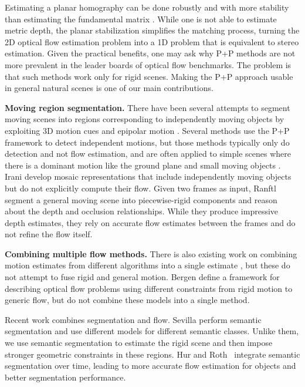 \documentclass[10pt,twocolumn,letterpaper]{article}
\begin{document}
Estimating a planar homography can be done robustly and with more stability
than estimating the fundamental matrix
\cite{Irani:1998:ReferenceFrames,Irani:PAMI:1997}. 
While one is not able to estimate metric depth, the planar
stabilization simplifies the matching process, turning the 2D optical
flow estimation problem into a 1D problem that is equivalent to stereo
estimation.
Given the practical benefits, one may ask why P+P
methods are not more prevalent in the leader boards of
optical flow benchmarks. 
The problem is that such methods work only for rigid scenes.
Making the P+P approach usable in general natural scenes is one of our main contributions.

{\bf Moving region segmentation.}
There have been several attempts to segment moving scenes into regions
corresponding to independently moving objects by exploiting 3D motion
cues and epipolar motion \cite{Adiv:1985:PAMI,Thompson:1990:IJCV,Weber:PAMI:1997}.
Several methods use the P+P framework to detect independent motions, but those
methods typically only do detection and not flow estimation, and are
often applied to simple scenes where there is a dominant motion
like the ground plane and small moving objects
\cite{Irani:1998:MovingObjectDetection,Sawhney:2000:PAMI,Yuan:2007:PAMI}.
Irani \etal \cite{Irani96efficientrepresentations} develop mosaic representations that
include independently moving objects but do not explicitly compute their
flow. Given two frames as input, Ranftl \etal~\cite{Ranftl:2016:DenseMonocularDepthEstimation} segment a general moving scene into piecewise-rigid components and reason about the depth and occlusion relationships.
While they produce impressive depth estimates,
they rely on accurate flow estimates between the frames and do not refine the flow itself.










{\bf Combining multiple flow methods.}
There is also existing work on combining motion
estimates from different algorithms into a single estimate \cite{FusionFlow,Brostow},
but these do not attempt to fuse rigid and general motion.
Bergen \etal \cite{Bergen:ECCV:1992} define a
framework for describing optical flow problems using different
constraints from rigid motion to generic flow, but do not combine
these models into a single method. 





Recent work combines segmentation and flow. Sevilla \etal \cite{Sevilla:SOF} perform semantic segmentation
and use different models for different semantic classes.
Unlike them, we use semantic segmentation to estimate the rigid scene and then impose stronger geometric constraints in
these regions.
Hur and Roth~\cite{Hur2016} integrate semantic segmentation over time, leading to more accurate flow estimation for objects and better segmentation performance.
\end{document}
